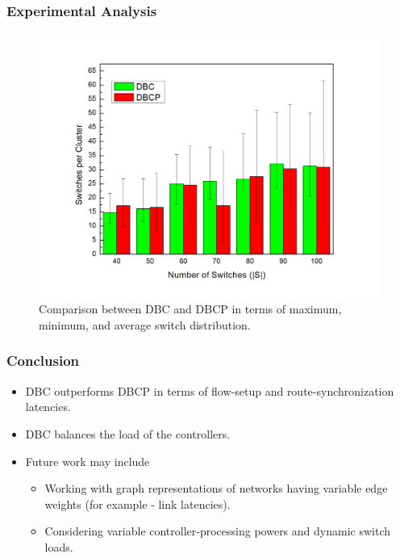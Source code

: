\documentclass{beamer}
\begin{document}
\begin{frame}
\frametitle{Experimental Analysis}
\begin{figure}
	\includegraphics[width=0.8\linewidth]{Figures/loadBalance.jpg}
	\caption{Comparison between DBC and DBCP in terms of maximum, minimum, and average switch distribution.}
\end{figure}
\end{frame}


\begin{frame}
\frametitle{Conclusion}
\begin{itemize}
	\item DBC outperforms DBCP in terms of flow-setup and route-synchronization latencies.
	\item DBC balances the load of the controllers.
	\item Future work may include
	\begin{itemize}
		\item Working with graph representations of networks having variable edge weights (for example - link latencies).
		\item Considering variable controller-processing powers and dynamic switch loads.
	\end{itemize}
\end{itemize}
\end{frame}
 
\end{document}
